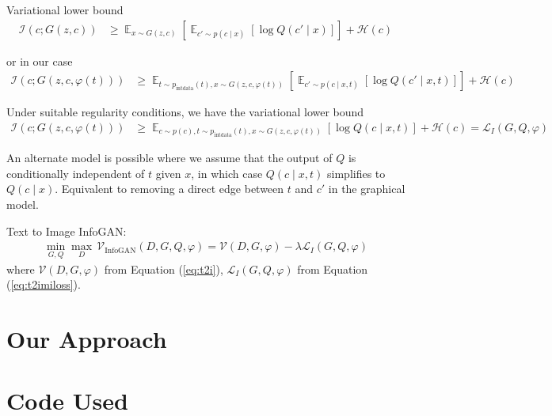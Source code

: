 \documentclass{article}
\DeclareMathOperator*{\E}{\mathbb{E}}
\begin{document}
Variational lower bound
\begin{align}
\mathcal{I}(c;G(z,c)) &\geq \E_{x\sim G(z,c)}\left[\E_{c'\sim p(c\mid x)}\left[\log Q(c'\mid x)\right]\right] + \mathcal{H}(c)
\end{align}

or in our case
\begin{align}
\mathcal{I}(c;G(z,c,\varphi(t))) &\geq \E_{t\sim p_{\text{intdata}}(t), x\sim G(z,c,\varphi(t))}\left[\E_{c'\sim p(c\mid x,t)}\left[\log Q(c'\mid x,t)\right]\right] + \mathcal{H}(c)
\end{align}

Under suitable regularity conditions, we have the variational lower bound
\begin{align}
\mathcal{I}(c;G(z,c, \varphi(t))) &\geq \E_{c\sim p(c), t\sim p_{\text{intdata}}(t), x\sim G(z,c, \varphi(t))}\left[\log Q(c\mid x,t)\right] + \mathcal{H}(c) = \mathcal{L}_I(G,Q,\varphi) \label{eq:t2imiloss}
\end{align}

An alternate model is possible where we assume that the output of $Q$ is conditionally independent of $t$ given $x$, in which case $Q(c\mid x,t)$ simplifies to $Q(c\mid x)$. Equivalent to removing a direct edge between $t$ and $c'$ in the graphical model.

Text to Image InfoGAN:
\begin{align}
\min_{G,Q} \max_D\, \mathcal{V}_{\text{InfoGAN}}(D,G,Q,\varphi) = \mathcal{V}(D,G,\varphi) - \lambda \mathcal{L}_I(G,Q,\varphi)
\end{align}
where $\mathcal{V}(D,G,\varphi)$ from Equation (\ref{eq:t2i}), $\mathcal{L}_I(G,Q,\varphi)$ from Equation (\ref{eq:t2imiloss}).




\section{Our Approach}

\section{Code Used}
\end{document}

